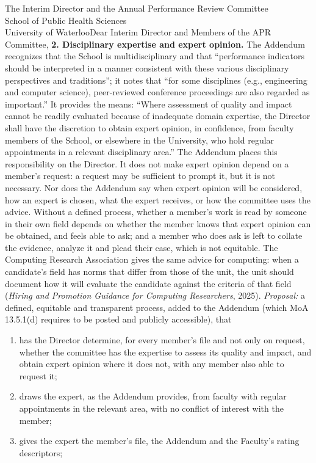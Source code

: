 \begin{aprletter}{%
The Interim Director and the Annual Performance Review Committee\\
School of Public Health Sciences\\
University of Waterloo}{Dear Interim Director and Members of the APR Committee,}
\textbf{2. Disciplinary expertise and expert opinion.} The Addendum recognizes that the School is multidisciplinary and that ``performance indicators should be interpreted in a manner consistent with these various disciplinary perspectives and traditions''; it notes that ``for some disciplines (e.g., engineering and computer science), peer-reviewed conference proceedings are also regarded as important.'' It provides the means: ``Where assessment of quality and impact cannot be readily evaluated because of inadequate domain expertise, the Director shall have the discretion to obtain expert opinion, in confidence, from faculty members of the School, or elsewhere in the University, who hold regular appointments in a relevant disciplinary area.'' The Addendum places this responsibility on the Director. It does not make expert opinion depend on a member's request: a request may be sufficient to prompt it, but it is not necessary. Nor does the Addendum say when expert opinion will be considered, how an expert is chosen, what the expert receives, or how the committee uses the advice. Without a defined process, whether a member's work is read by someone in their own field depends on whether the member knows that expert opinion can be obtained, and feels able to ask; and a member who does ask is left to collate the evidence, analyze it and plead their case, which is not equitable. The Computing Research Association gives the same advice for computing: when a candidate's field has norms that differ from those of the unit, the unit should document how it will evaluate the candidate against the criteria of that field (\emph{Hiring and Promotion Guidance for Computing Researchers}, 2025). \emph{Proposal:} a defined, equitable and transparent process, added to the Addendum (which MoA 13.5.1(d) requires to be posted and publicly accessible), that
\begin{enumerate}[leftmargin=1.75em, itemsep=2pt, topsep=4pt, parsep=0pt, label=(\alph*)]
    \item has the Director determine, for every member's file and not only on request, whether the committee has the expertise to assess its quality and impact, and obtain expert opinion where it does not, with any member also able to request it;
    \item draws the expert, as the Addendum provides, from faculty with regular appointments in the relevant area, with no conflict of interest with the member;
    \item gives the expert the member's file, the Addendum and the Faculty's rating descriptors;

\end{enumerate}
\end{aprletter}
